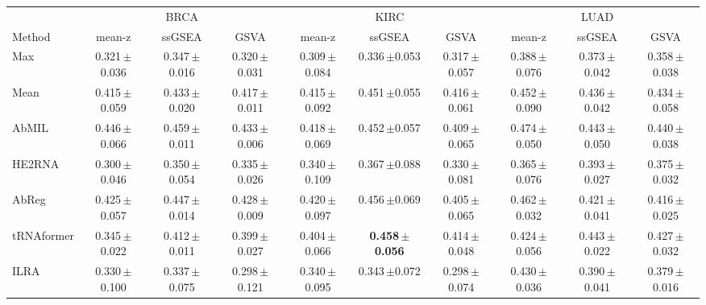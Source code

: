 \begin{tabular}{lccccccccc}
\toprule
& \multicolumn{3}{c}{BRCA} & \multicolumn{3}{c}{KIRC} & \multicolumn{3}{c}{LUAD}\\
\cmidrule(lr){2-4}\cmidrule(lr){5-7}\cmidrule(lr){8-10}
Method & mean-z & ssGSEA & GSVA & mean-z & ssGSEA & GSVA & mean-z & ssGSEA & GSVA\\
\midrule
Max & 0.321\,{\tiny$\pm$0.036} & 0.347\,{\tiny$\pm$0.016} & 0.320\,{\tiny$\pm$0.031} & 0.309\,{\tiny$\pm$0.084} & 0.336\,{\tiny$\pm$0.053} & 0.317\,{\tiny$\pm$0.057} & 0.388\,{\tiny$\pm$0.076} & 0.373\,{\tiny$\pm$0.042} & 0.358\,{\tiny$\pm$0.038}\\
Mean & 0.415\,{\tiny$\pm$0.059} & 0.433\,{\tiny$\pm$0.020} & 0.417\,{\tiny$\pm$0.011} & 0.415\,{\tiny$\pm$0.092} & 0.451\,{\tiny$\pm$0.055} & 0.416\,{\tiny$\pm$0.061} & 0.452\,{\tiny$\pm$0.090} & 0.436\,{\tiny$\pm$0.042} & 0.434\,{\tiny$\pm$0.058}\\
AbMIL & 0.446\,{\tiny$\pm$0.066} & 0.459\,{\tiny$\pm$0.011} & 0.433\,{\tiny$\pm$0.006} & 0.418\,{\tiny$\pm$0.069} & 0.452\,{\tiny$\pm$0.057} & 0.409\,{\tiny$\pm$0.065} & 0.474\,{\tiny$\pm$0.050} & 0.443\,{\tiny$\pm$0.050} & 0.440\,{\tiny$\pm$0.038}\\
HE2RNA & 0.300\,{\tiny$\pm$0.046} & 0.350\,{\tiny$\pm$0.054} & 0.335\,{\tiny$\pm$0.026} & 0.340\,{\tiny$\pm$0.109} & 0.367\,{\tiny$\pm$0.088} & 0.330\,{\tiny$\pm$0.081} & 0.365\,{\tiny$\pm$0.076} & 0.393\,{\tiny$\pm$0.027} & 0.375\,{\tiny$\pm$0.032}\\
AbReg & 0.425\,{\tiny$\pm$0.057} & 0.447\,{\tiny$\pm$0.014} & 0.428\,{\tiny$\pm$0.009} & 0.420\,{\tiny$\pm$0.097} & 0.456\,{\tiny$\pm$0.069} & 0.405\,{\tiny$\pm$0.065} & 0.462\,{\tiny$\pm$0.032} & 0.421\,{\tiny$\pm$0.041} & 0.416\,{\tiny$\pm$0.025}\\
tRNAformer & 0.345\,{\tiny$\pm$0.022} & 0.412\,{\tiny$\pm$0.011} & 0.399\,{\tiny$\pm$0.027} & 0.404\,{\tiny$\pm$0.066} & \textbf{0.458\,{\tiny$\pm$0.056}} & 0.414\,{\tiny$\pm$0.048} & 0.424\,{\tiny$\pm$0.056} & 0.443\,{\tiny$\pm$0.022} & 0.427\,{\tiny$\pm$0.032}\\
ILRA & 0.330\,{\tiny$\pm$0.100} & 0.337\,{\tiny$\pm$0.075} & 0.298\,{\tiny$\pm$0.121} & 0.340\,{\tiny$\pm$0.095} & 0.343\,{\tiny$\pm$0.072} & 0.298\,{\tiny$\pm$0.074} & 0.430\,{\tiny$\pm$0.036} & 0.390\,{\tiny$\pm$0.041} & 0.379\,{\tiny$\pm$0.016}\\

\end{tabular}
